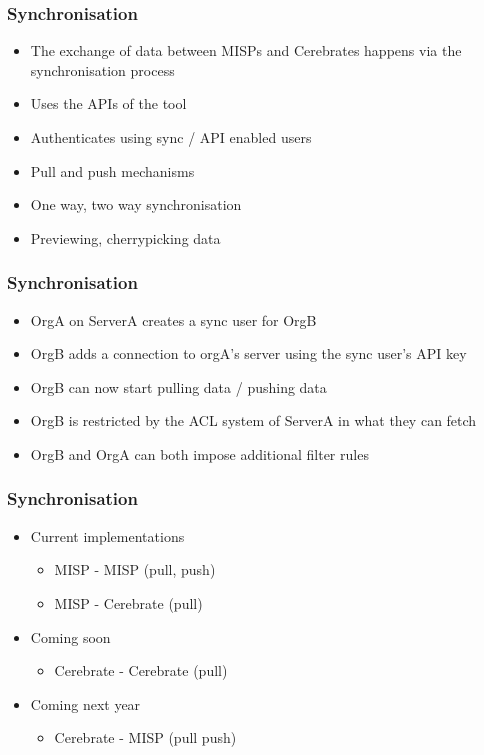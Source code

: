 \begin{frame}
  \frametitle{Synchronisation}
  \begin{itemize}
    \item The exchange of data between MISPs and Cerebrates happens via the synchronisation process
    \item Uses the APIs of the tool
    \item Authenticates using sync / API enabled users
    \item Pull and push mechanisms
    \item One way, two way synchronisation
    \item Previewing, cherrypicking data
  \end{itemize}
\end{frame}

\begin{frame}
  \frametitle{Synchronisation}
  \begin{itemize}
    \item OrgA on ServerA creates a sync user for OrgB
    \item OrgB adds a connection to orgA's server using the sync user's API key
    \item OrgB can now start pulling data / pushing data
    \item OrgB is restricted by the ACL system of ServerA in what they can fetch
    \item OrgB and OrgA can both impose additional filter rules
  \end{itemize}
\end{frame}

\begin{frame}
  \frametitle{Synchronisation}
  \begin{itemize}
    \item Current implementations
    \begin{itemize}
        \item MISP - MISP (pull, push)
        \item MISP - Cerebrate (pull)
    \end{itemize}
    \item Coming soon
    \begin{itemize}
        \item Cerebrate - Cerebrate (pull)
    \end{itemize}
    \item Coming next year
    \begin{itemize}
        \item Cerebrate - MISP (pull push)
    \end{itemize}
  \end{itemize}
\end{frame}

